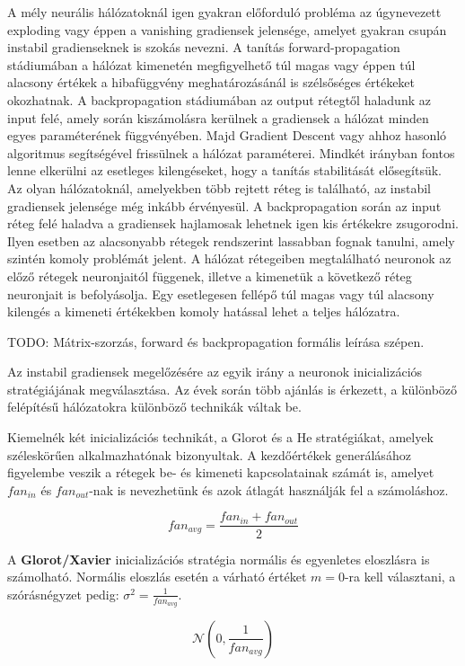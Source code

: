 A mély neurális hálózatoknál igen gyakran előforduló probléma az úgynevezett exploding vagy éppen a vanishing gradiensek jelensége, amelyet gyakran csupán instabil gradienseknek is szokás nevezni.
A tanítás forward-propagation stádiumában a hálózat kimenetén megfigyelhető túl magas vagy éppen túl alacsony értékek a hibafüggvény meghatározásánál is szélsőséges értékeket okozhatnak.
A backpropagation stádiumában az output rétegtől haladunk az input felé, amely során kiszámolásra kerülnek a gradiensek a hálózat minden egyes paraméterének függvényében. Majd Gradient Descent vagy ahhoz hasonló algoritmus segítségével frissülnek a hálózat paraméterei. Mindkét irányban fontos lenne elkerülni az esetleges kilengéseket, hogy a tanítás stabilitását elősegítsük.
Az olyan hálózatoknál, amelyekben több rejtett réteg is található, az instabil gradiensek jelensége még inkább érvényesül. A backpropagation során az input réteg felé haladva a gradiensek hajlamosak lehetnek igen kis értékekre zsugorodni. Ilyen esetben az alacsonyabb rétegek rendszerint lassabban fognak tanulni, amely szintén komoly problémát jelent.
A hálózat rétegeiben megtalálható neuronok az előző rétegek neuronjaitól függenek, illetve a kimenetük a következő réteg neuronjait is befolyásolja. Egy esetlegesen fellépő túl magas vagy túl alacsony kilengés a kimeneti értékekben komoly hatással lehet a teljes hálózatra.

TODO: Mátrix-szorzás, forward és backpropagation formális leírása szépen.

Az instabil gradiensek megelőzésére az egyik irány a neuronok inicializációs stratégiájának megválasztása.
Az évek során több ajánlás is érkezett, a különböző felépítésű hálózatokra különböző technikák váltak be.

Kiemelnék két inicializációs technikát, a Glorot és a He stratégiákat, amelyek széleskörűen alkalmazhatónak bizonyultak.
A kezdőértékek generálásához figyelembe veszik a rétegek be- és kimeneti kapcsolatainak számát is, amelyet $fan_{in}$ és $fan_{out}$-nak is nevezhetünk és azok átlagát használják fel a számoláshoz.

$$fan_{avg} = \frac{fan_{in} + fan_{out}}{2}$$

A \textbf{Glorot/Xavier} inicializációs stratégia normális és egyenletes eloszlásra is számolható.
Normális eloszlás esetén a várható értéket $m = 0$-ra kell választani, a szórásnégyzet pedig: $ \sigma^2 = \frac{1}{fan_{avg}} $.

$$ \mathcal{N}(0, \frac{1}{fan_{avg}}) $$

